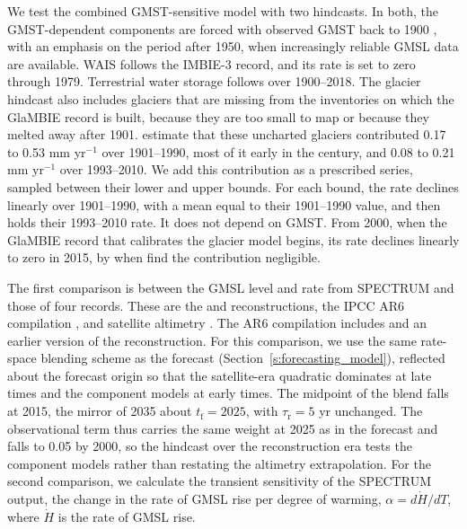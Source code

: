 \documentclass[draft,linenumbers]{agujournal2025}
\begin{document}
We test the combined GMST-sensitive model with two hindcasts. In both, the GMST-dependent components are forced with observed GMST back to 1900 \citep{Rohde2020}, with an emphasis on the period after 1950, when increasingly reliable GMSL data are available. WAIS follows the IMBIE-3 record, and its rate is set to zero through 1979. Terrestrial water storage follows \citet{Frederikse2020} over 1900--2018. The glacier hindcast also includes glaciers that are missing from the inventories on which the GlaMBIE record is built, because they are too small to map or because they melted away after 1901. \citet{Parkes2018} estimate that these uncharted glaciers contributed 0.17 to 0.53 mm yr$^{-1}$ over 1901--1990, most of it early in the century, and 0.08 to 0.21 mm yr$^{-1}$ over 1993--2010. We add this contribution as a prescribed series, sampled between their lower and upper bounds. For each bound, the rate declines linearly over 1901--1990, with a mean equal to their 1901--1990 value, and then holds their 1993--2010 rate. It does not depend on GMST. From 2000, when the GlaMBIE record that calibrates the glacier model begins, its rate declines linearly to zero in 2015, by when \citet{Parkes2018} find the contribution negligible.

The first comparison is between the GMSL level and rate from SPECTRUM and those of four records. These are the \citet{Frederikse2020} and \citet{Dangendorf2024} reconstructions, the IPCC AR6 compilation \citep{Fox-Kemper2021}, and satellite altimetry \citep{Beckley2017}. The AR6 compilation includes \citet{Frederikse2020} and an earlier version of the \citet{Dangendorf2024} reconstruction. For this comparison, we use the same rate-space blending scheme as the forecast (Section~\ref{s:forecasting_model}), reflected about the forecast origin so that the satellite-era quadratic dominates at late times and the component models at early times. The midpoint of the blend falls at 2015, the mirror of 2035 about $t_{\mathrm{f}} = 2025$, with $\tau_{\mathrm{r}} = 5$ yr unchanged. The observational term thus carries the same weight at 2025 as in the forecast and falls to 0.05 by 2000, so the hindcast over the reconstruction era tests the component models rather than restating the altimetry extrapolation. For the second comparison, we calculate the transient sensitivity of the SPECTRUM output, the change in the rate of GMSL rise per degree of warming, $\alpha = d\dot{H}/dT$, where $\dot{H}$ is the rate of GMSL rise. 
\end{document}
